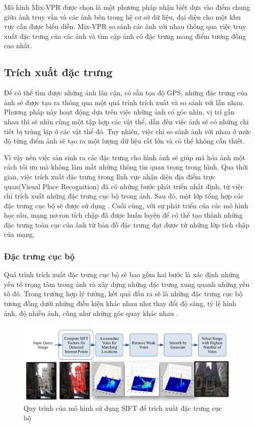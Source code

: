 Mô hình Mix-VPR được chọn là một phương pháp nhận biết dựa vào điểm chung giữa ảnh truy vấn và các ảnh bên trong hệ cơ sở dữ liệu, đại diện cho một khu vực cần được biểu diễn. Mix-VPR so sánh các ảnh với nhau thông qua việc truy xuất đặc trưng của các ảnh và tìm cặp ảnh có đặc trưng mang điểm tương đồng cao nhất.

\subsection{Trích xuất đặc trưng}
Để có thể tìm được những ảnh lân cận, có sẵn tọa độ GPS, những đặc trưng của ảnh sẽ được tạo ra thông qua một quá trính trích xuất và so sánh với lẫn nhau. Phương pháp này hoạt động dựa trên việc những ảnh có góc nhìn, vị trí gần nhau thì sẽ nhìn cùng một tập hợp các vật thể, dẫn đến việc ảnh sẽ có những chi tiết bị trùng lặp ở các vật thể đó. Tuy nhiên, việc chỉ so sánh ảnh với nhau ở mức độ từng điểm ảnh sẽ tạo ra một lượng dữ liệu rất lớn và có thể không cần thiết. 

Vì vậy nên việc sản sinh ra các đặc trưng cho hình ảnh sẽ giúp mã hóa ảnh một cách tối ưu mà không làm mất những thông tin quan trọng trong hình. Qua thời gian, việc trích xuất đặc trưng trong lĩnh vực nhận diện địa điểm trực quan(Visual Place Recognition) đã có những bước phát triển nhất định, từ việc chỉ trích xuất những đặc trưng cục bộ trong ảnh. Sau đó, một lớp tổng hợp các đặc trưng cục bộ sẽ được sử dụng \cite{pion2020benchmarking}. Cuối cùng, với sự phát triển của các mô hình học sâu, mạng nơ-ron tích chập đã được huấn luyện để có thể tạo thành những đặc trưng toàn cục của ảnh từ bản đồ đặc trưng đạt được từ những lớp tích chập của mạng.
\subsubsection*{Đặc trưng cục bộ}
Quá trình trích xuất đặc trưng cục bộ sẽ bao gồm hai bước là xác định những yếu tố trọng tâm trong ảnh và xây dựng những đặc trưng xung quanh những yếu tố đó. Trong trường hợp lý tưởng, kết quả đầu ra sẽ là những đặc trưng cục bộ tương đồng dưới những điều kiện khác nhau như thay đổi độ sáng, tỷ lệ hình ảnh, độ nhiễu ảnh, cũng như những góc quay khác nhau \cite{lowe1999object}.

\begin{figure}[H]
    \centering
    \includegraphics[scale=0.5]{pics/Chapter3/SIFT.png}
    \caption{Quy trình của mô hình sử dụng SIFT để trích xuất đặc trưng cục bộ \cite{zamir2010accurate}}
    \label{fig:enter-label}
\end{figure}

